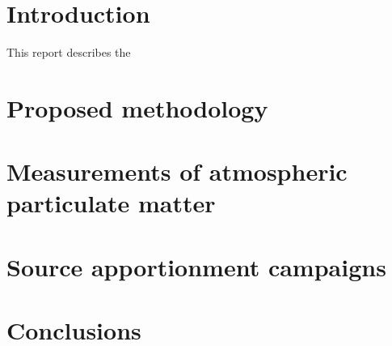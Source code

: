 \documentclass{nwureport}
\begin{document}
\pagestyle{mainmatter}


\chapter{Introduction}

This report describes the 


\chapter{Proposed methodology}


\chapter{Measurements of atmospheric particulate matter}


\chapter{Source apportionment campaigns}



\chapter{Conclusions}


\begin{spacing}{0.3}
\linespread{0.8} \normalsize

\end{spacing}
\end{document}

